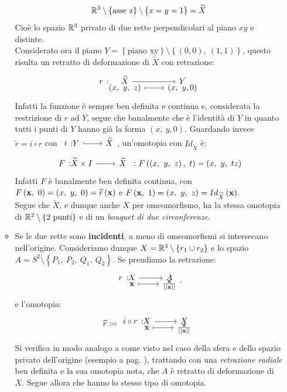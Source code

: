 \begin{examples}
\begin{enumerate}
\begin{itemize}
			\begin{equation*}
				\mathbb{R}^3\setminus\left\{\text{asse z}\right\}\setminus\left\{x=y=1\right\}=\widetilde{X}
			\end{equation*}
		Cioè lo spazio $\mathbb{R}^3$ privato di due rette perpendicolari al piano $xy$ e distinte.\\
			Considerato ora il piano $Y=\left\{\text{piano xy}\right\}\setminus\left\{\left(0,0\right),\ \left(1,1\right)\right\}$, questo risulta un retratto di deformazione di $\widetilde{X}$ con retrazione:
			\begin{equation*}
				\funztot{r}{\widetilde{X}}{Y}{\left(x,\ y,\ z\right)}{\left(x,\ y, 0\right)}
			\end{equation*}
		Infatti la funzione è sempre ben definita e continua e, considerata la restrizione di $r$ ad $Y$, segue che banalmente che è l'identità di $Y$ in quanto tutti i punti di $Y$ hanno già la forma $\left(x,\ y, 0\right)$. Guardando invece $\widetilde{r}=i\circ r$ con $\incl{i}{Y}{\widetilde{X}}$, un'omotopia con $Id_{\widetilde{X}}$ è:
		\begin{equation*}
			\funz{F}{\widetilde{X}\times I}{\widetilde{X}}\ \colon \mvf{F}{\left(x,\ y,\ z\right)}{t}=\left(x,\ y,\ tz\right)
		\end{equation*}
		Infatti $F$ è banalmente ben definita continua, con $\mvf{F}{\mathbf{x}}{0}=\left(x,\ y,\ 0\right)=\widetilde{r}\left(\mathbf{x}\right)$ e $\mvf{F}{\mathbf{x}}{1}=\left(x,\ y,\ z\right)=Id_{\widetilde{X}}\left(\mathbf{x}\right)$.\\
		Segue che $\widetilde{X}$, e dunque anche $X$ per omeomorfismo, ha la stessa omotopia di $\mathbb{R}^2\setminus\left\{2\text{ punti}\right\}$ e di un \textit{bouquet di due circonferenze}.
		\item Se le due rette sono \textbf{incidenti}, a meno di omeomorfismi si intersecano nell'origine. Consideriamo dunque $X=\mathbb{R}^3\setminus\left\{r_1\cup r_2\right\}$ e lo spazio $A=S^2\setminus\left\{P_1,\ P_2,\ Q_1,\ Q_2\right\}$. Se prendiamo la retrazione:
		\begin{equation*}
			\funztot{r}{X}{A}{\mathbf{x}}{\frac{\mathbf{x}}{\labs \mathbf{x}\rabs}}.
		\end{equation*}
		e l'omotopia:
		\begin{equation*}
			\widetilde{r}\coloneqq\funztot{ i\circ r}{X}{X}{\mathbf{x}}{\frac{\mathbf{x}}{\labs \mathbf{x}\rabs}}
		\end{equation*}
	Si verifica in modo analogo a come visto nel caso della sfera e dello spazio privato dell'origine (esempio a pag. \pageref{retrattosfera}), trattando con una \textit{retrazione radiale} ben definita e la sua omotopia nota, che $A$ è retratto di deformazione di $X$. Segue allora che hanno lo stesso tipo di omotopia.
		\end{itemize}
	\end{enumerate}
	\vspace{-3mm}
\end{examples}
